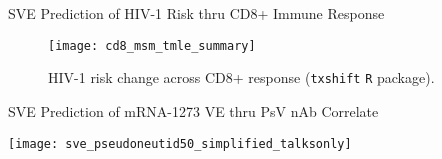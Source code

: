 \documentclass{beamer}
\begin{document}

\begin{frame}[c]{SVE Prediction of HIV-1 Risk thru CD8+ Immune Response}

\vspace{-0.3in}
\begin{figure}[H]
  \centering
  \texttt{[image: cd8\_msm\_tmle\_summary]}
  \captionsetup{labelformat=empty}
  \vspace{-1.5em}
  \caption{
    HIV-1 risk change across CD8+ response (\texttt{txshift} \texttt{R}
    package).
  }
\end{figure}

\note{
}

\end{frame}


\begin{frame}[c]{SVE Prediction of mRNA-1273 VE thru PsV nAb Correlate}

\vspace*{-0.1cm}
\hspace*{-0.3cm}\texttt{[image: sve\_pseudoneutid50\_simplified\_talksonly]}

\note{
}

\end{frame}








\end{document}
